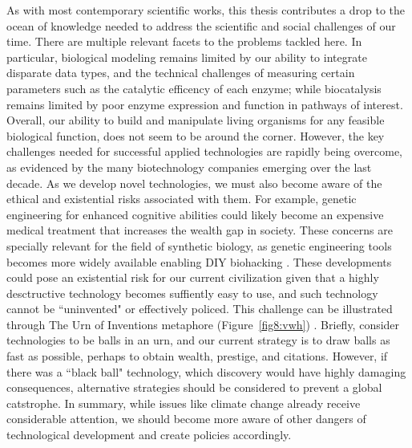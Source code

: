 As with most contemporary scientific works, this thesis contributes a drop to the ocean of knowledge needed to address the scientific and social challenges of our time.
 There are multiple relevant facets to the problems tackled here. In particular, biological modeling remains limited by our ability to integrate disparate data types, and the technical challenges of measuring certain parameters such as the catalytic efficency of each enzyme;  while biocatalysis remains limited by poor enzyme expression and function in pathways of interest. %
Overall, our ability to build and manipulate living organisms for any feasible biological function, does not seem to be around the corner.
However, the key challenges needed for successful applied technologies are rapidly being overcome, as evidenced by the many biotechnology companies emerging over the last decade.
As we develop novel technologies, we must also become aware of the ethical and existential risks associated with them.
For example, genetic engineering for enhanced cognitive abilities could likely become an expensive medical treatment that increases the wealth gap in society. %
These concerns are specially relevant for the field of synthetic biology, as genetic engineering tools becomes more widely available enabling DIY biohacking \citep{bennett2009}.
These developments could pose an existential risk for our current civilization given that a highly desctructive technology becomes suffiently easy to use,  and such technology cannot be ``uninvented" or effectively policed.
This challenge can be illustrated through The Urn of Inventions metaphore (Figure~\ref{fig8:vwh}) \citep{bostrom2019}. %
Briefly, consider technologies to be balls in an urn, and our current strategy is to draw balls as fast as possible, perhaps to obtain wealth, prestige, and citations. However, if there was a ``black ball" technology, which discovery would have highly damaging consequences, alternative strategies should be considered to prevent a global catstrophe.
In summary, while issues like climate change already receive considerable attention, we should become more aware of other dangers of technological development and create policies accordingly.

